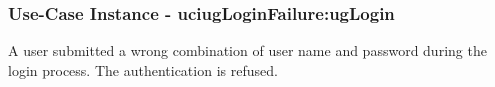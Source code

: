 
	\subsubsection{Use-Case Instance - uciugLoginFailure:ugLogin}
	
	A user submitted a wrong combination of user name and password during the login process. The authentication is refused.		  
	\begin{operationmodel}
	
	\end{operationmodel} 

	
